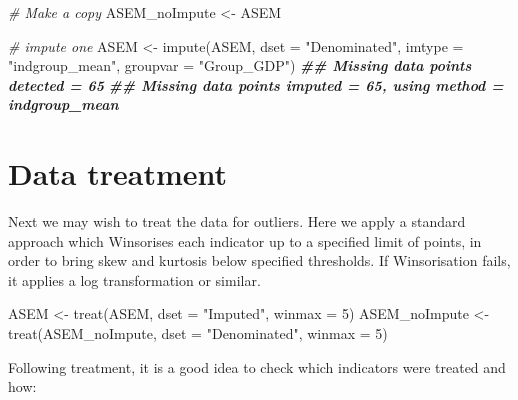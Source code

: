 \documentclass[
]{book}
\newenvironment{Shaded}{\begin{snugshade}}{\end{snugshade}}
\newcommand{\AttributeTok}[1]{\textcolor[rgb]{0.77,0.63,0.00}{#1}}
\newcommand{\CommentTok}[1]{\textcolor[rgb]{0.56,0.35,0.01}{\textit{#1}}}
\newcommand{\DecValTok}[1]{\textcolor[rgb]{0.00,0.00,0.81}{#1}}
\newcommand{\DocumentationTok}[1]{\textcolor[rgb]{0.56,0.35,0.01}{\textbf{\textit{#1}}}}
\newcommand{\FunctionTok}[1]{\textcolor[rgb]{0.00,0.00,0.00}{#1}}
\newcommand{\NormalTok}[1]{#1}
\newcommand{\OtherTok}[1]{\textcolor[rgb]{0.56,0.35,0.01}{#1}}
\newcommand{\StringTok}[1]{\textcolor[rgb]{0.31,0.60,0.02}{#1}}
\begin{document}
\begin{Shaded}
\begin{Highlighting}[]
\CommentTok{\# Make a copy}
\NormalTok{ASEM\_noImpute }\OtherTok{\textless{}{-}}\NormalTok{ ASEM}

\CommentTok{\# impute one}
\NormalTok{ASEM }\OtherTok{\textless{}{-}} \FunctionTok{impute}\NormalTok{(ASEM, }\AttributeTok{dset =} \StringTok{"Denominated"}\NormalTok{, }\AttributeTok{imtype =} \StringTok{"indgroup\_mean"}\NormalTok{, }\AttributeTok{groupvar =} \StringTok{"Group\_GDP"}\NormalTok{)}
\DocumentationTok{\#\# Missing data points detected = 65}
\DocumentationTok{\#\# Missing data points imputed = 65, using method = indgroup\_mean}
\end{Highlighting}
\end{Shaded}

\hypertarget{data-treatment-1}{%
\section{Data treatment}\label{data-treatment-1}}

Next we may wish to treat the data for outliers. Here we apply a standard approach which Winsorises each indicator up to a specified limit of points, in order to bring skew and kurtosis below specified thresholds. If Winsorisation fails, it applies a log transformation or similar.

\begin{Shaded}
\begin{Highlighting}[]
\NormalTok{ASEM }\OtherTok{\textless{}{-}} \FunctionTok{treat}\NormalTok{(ASEM, }\AttributeTok{dset =} \StringTok{"Imputed"}\NormalTok{, }\AttributeTok{winmax =} \DecValTok{5}\NormalTok{)}
\NormalTok{ASEM\_noImpute }\OtherTok{\textless{}{-}} \FunctionTok{treat}\NormalTok{(ASEM\_noImpute, }\AttributeTok{dset =} \StringTok{"Denominated"}\NormalTok{, }\AttributeTok{winmax =} \DecValTok{5}\NormalTok{)}
\end{Highlighting}
\end{Shaded}

Following treatment, it is a good idea to check which indicators were treated and how:
\end{document}
